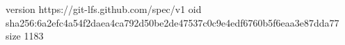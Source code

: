 version https://git-lfs.github.com/spec/v1
oid sha256:6a2efc4a54f2daea4ca792d50be2de47537c0c9e4edf6760b5f6eaa3e87dda77
size 1183
